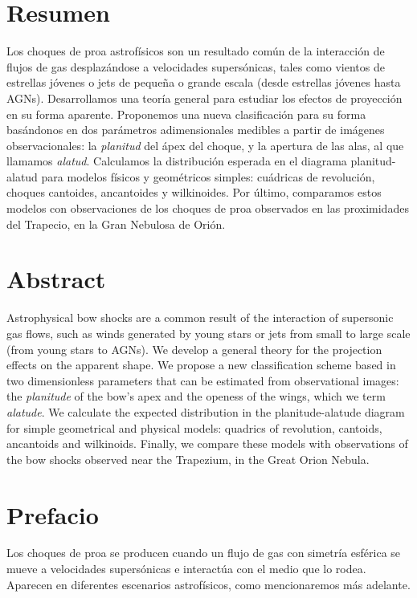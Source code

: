 \documentclass[11pt, twoside]{book}
\begin{document}
\section*{\centering Resumen}

Los choques de proa astrofísicos son un resultado común de la interacción de flujos de gas desplazándose a velocidades supersónicas, tales como vientos de estrellas jóvenes o jets de pequeña o grande escala (desde estrellas jóvenes hasta AGNs). Desarrollamos una teoría general para estudiar los efectos de proyección en su forma aparente. Proponemos una nueva clasificación para su forma basándonos en dos parámetros adimensionales medibles a partir de imágenes observacionales: la \textit{planitud} del ápex del choque, y la apertura de las alas, al que llamamos \textit{alatud}. Calculamos la distribución esperada en el diagrama planitud-alatud para modelos físicos y geométricos simples: cuádricas de revolución, choques cantoides, ancantoides y wilkinoides. Por último, comparamos estos modelos con observaciones de los choques de proa observados en las proximidades del Trapecio, en la Gran Nebulosa de Orión.


\section*{\centering Abstract}
  Astrophysical bow shocks are a common result of the interaction of supersonic gas flows, such as winds generated by young stars or jets from small to large scale (from young stars to AGNs). We develop a general theory for the projection effects on the apparent shape. We propose a new classification scheme based in two dimensionless parameters that can be estimated from observational images: the \textit{planitude} of the bow's apex and the openess of the wings, which we term \textit{alatude}. We calculate the expected distribution in the planitude-alatude diagram for simple geometrical and physical models: quadrics of revolution, cantoids, ancantoids and wilkinoids. Finally, we compare these models with observations of the bow shocks observed near the Trapezium, in the Great Orion Nebula.

\newpage
\section*{\centering Prefacio}

Los choques de proa se producen cuando un flujo de gas con simetría esférica se mueve a velocidades supersónicas e interactúa con el medio que lo rodea. Aparecen en diferentes escenarios astrofísicos, como mencionaremos más adelante.
\end{document}
